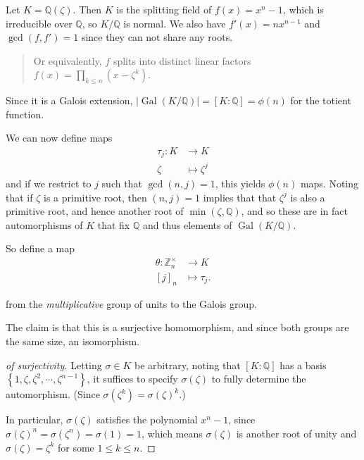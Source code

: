 \begin{solution}

\envlist

Let \(K = {\mathbb{Q}}(\zeta)\). Then \(K\) is the splitting field of
\(f(x) = x^n - 1\), which is irreducible over \({\mathbb{Q}}\), so
\(K/{\mathbb{Q}}\) is normal. We also have \(f'(x) = nx^{n-1}\) and
\(\gcd(f, f') = 1\) since they can not share any roots.

\begin{quote}
Or equivalently, \(f\) splits into distinct linear factors
\(f(x) = \prod_{k\leq n}(x-\zeta^k)\).
\end{quote}

Since it is a Galois extension,
\({\left\lvert {\operatorname{Gal}(K/{\mathbb{Q}})} \right\rvert} = [K: {\mathbb{Q}}] = \phi(n)\)
for the totient function.

We can now define maps
\begin{align*}
\tau_j: K &\to K \\
\zeta &\mapsto \zeta^j 
\end{align*}
and if we restrict to \(j\) such that \(\gcd(n, j) = 1\), this yields
\(\phi(n)\) maps. Noting that if \(\zeta\) is a primitive root, then
\((n, j) = 1\) implies that that \(\zeta^j\) is also a primitive root,
and hence another root of \(\min(\zeta, {\mathbb{Q}})\), and so these
are in fact automorphisms of \(K\) that fix \({\mathbb{Q}}\) and thus
elements of \(\operatorname{Gal}(K/{\mathbb{Q}})\).

So define a map
\begin{align*}
\theta: {\mathbb{Z}}_n^{\times}&\to K \\
[j]_n &\mapsto \tau_j
.\end{align*}

from the \emph{multiplicative} group of units to the Galois group.

The claim is that this is a surjective homomorphism, and since both
groups are the same size, an isomorphism.

\begin{proof}[of surjectivity]

Letting \(\sigma \in K\) be arbitrary, noting that \([K: {\mathbb{Q}}]\)
has a basis \(\left\{{1, \zeta, \zeta^2, \cdots, \zeta^{n-1}}\right\}\),
it suffices to specify \(\sigma(\zeta)\) to fully determine the
automorphism. (Since \(\sigma(\zeta^k) = \sigma(\zeta)^k\).)

In particular, \(\sigma(\zeta)\) satisfies the polynomial \(x^n - 1\),
since \(\sigma(\zeta)^n = \sigma(\zeta^n) = \sigma(1) = 1\), which means
\(\sigma(\zeta)\) is another root of unity and
\(\sigma(\zeta) = \zeta^k\) for some \(1\leq k \leq n\).


\end{proof}
\end{solution}
